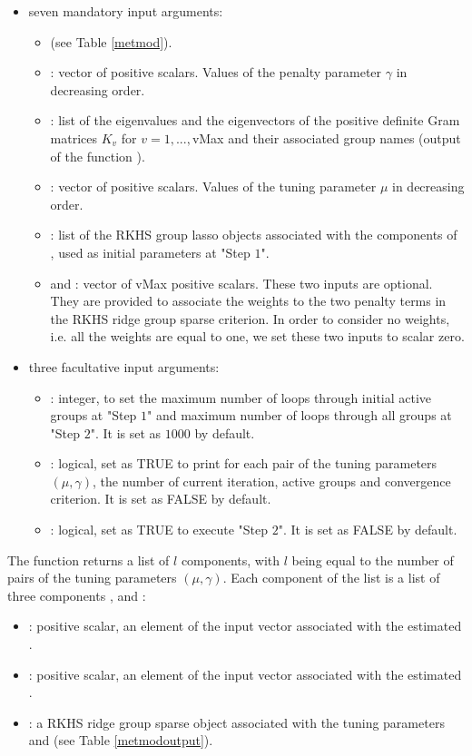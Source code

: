 \begin{itemize}
\item seven mandatory input arguments: 
\begin{itemize}
\item {} (see Table \ref{metmod}).
\item {}: vector of positive scalars. Values of the penalty parameter $\gamma$ in decreasing order.
\item {}: list of the eigenvalues and the eigenvectors of the positive definite Gram matrices $K_v$ for $v=1,...,$vMax and their associated group names (output of the function ).
\item {}: vector of positive scalars. Values of the tuning parameter $\mu$ in decreasing order.
\item {}: list of the RKHS group lasso objects associated with the components of , used as initial parameters at "Step $1$".
\item {} and : vector of vMax positive scalars. These two inputs are optional. They are provided to associate the weights to the two penalty terms in the RKHS ridge group sparse criterion. In order to consider no weights, i.e. all the weights are equal to one, we set these two inputs to scalar zero.
\end{itemize}
\item three facultative input arguments: 
\begin{itemize}
\item {}: integer, to set the maximum number of loops through initial active groups at "Step $1$" and maximum number of loops through all groups at "Step $2$".
It is set as $1000$ by default.
\item {}: logical, set as TRUE to print for each pair of the tuning parameters $(\mu,\gamma)$, the number of current iteration, active groups and convergence criterion. It is set as FALSE by default.
\item {}: logical, set as TRUE to execute "Step $2$".
It is set as FALSE by default.
\end{itemize}
\end{itemize}
The function  returns a list of $l$ components, with $l$ being equal to the number of pairs of the tuning parameters $(\mu,\gamma)$. Each component of the list is a list of three components ,  and :
\begin{itemize}
\item {}: positive scalar, an element of the input vector  associated with the estimated .
\item {}: positive scalar, an element of the input vector  associated with the estimated .
\item {}: a RKHS ridge group sparse object associated with the tuning parameters  and  (see Table \ref{metmodoutput}). 
\end{itemize}
